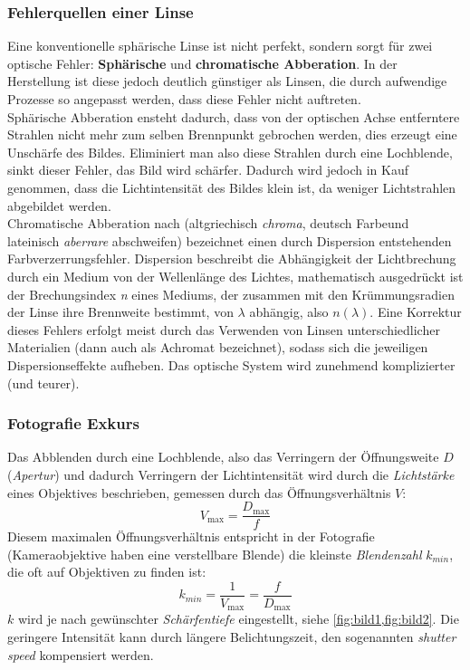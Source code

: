 \subsubsection{Fehlerquellen einer Linse}
Eine konventionelle sphärische Linse ist nicht perfekt, sondern sorgt für zwei optische Fehler: \textbf{Sphärische} und \textbf{chromatische Abberation}. In der Herstellung ist diese jedoch deutlich günstiger als Linsen, die durch aufwendige Prozesse so angepasst werden, dass diese Fehler nicht auftreten.\\
Sphärische Abberation ensteht dadurch, dass von der optischen Achse entferntere Strahlen nicht mehr zum selben Brennpunkt gebrochen werden, dies erzeugt eine Unschärfe des Bildes. Eliminiert man also diese Strahlen durch eine Lochblende, sinkt dieser Fehler, das Bild wird schärfer. Dadurch wird jedoch in Kauf genommen, dass die Lichtintensität des Bildes klein ist, da weniger Lichtstrahlen abgebildet werden.\\
Chromatische Abberation nach (altgriechisch \emph{chroma}, deutsch \glq Farbe\grq und lateinisch \emph{aberrare} \glq abschweifen\grq) bezeichnet einen durch Dispersion entstehenden Farbverzerrungsfehler. Dispersion beschreibt die Abhängigkeit der Lichtbrechung durch ein Medium von der Wellenlänge des Lichtes, mathematisch ausgedrückt ist der Brechungsindex \emph{n} eines Mediums, der zusammen mit den Krümmungsradien der Linse ihre Brennweite bestimmt, von \(\lambda\) abhängig, also \(n(\lambda)\). Eine Korrektur dieses Fehlers erfolgt meist durch das Verwenden von Linsen unterschiedlicher Materialien (dann auch als Achromat bezeichnet), sodass sich die jeweiligen Dispersionseffekte aufheben. Das optische System wird zunehmend komplizierter (und teurer).

\subsubsection{Fotografie Exkurs \autocite{Schärfentiefe}}
Das Abblenden durch eine Lochblende, also das Verringern der Öffnungsweite \(D\) (\emph{Apertur}) und dadurch Verringern der Lichtintensität wird durch die \emph{Lichtstärke} eines Objektives beschrieben, gemessen durch das Öffnungsverhältnis \(V\):
\begin{equation}
    V_{{\text{max}}} = \frac{D_{\text{max}}}{f}
\end{equation}
Diesem maximalen Öffnungsverhältnis entspricht in der Fotografie (Kameraobjektive haben eine verstellbare Blende) die kleinste \emph{Blendenzahl} \(k_{min}\), die oft auf Objektiven zu finden ist:
\begin{equation}
    k_{min}=\frac{1}{V_{\text{max}}}=\frac{f}{D_{\text{max}}}
    \label{eq:k}
\end{equation}
\(k\) wird je nach gewünschter \emph{Schärfentiefe} eingestellt, siehe \cref{fig:bild1,fig:bild2}. Die geringere Intensität kann durch längere Belichtungszeit, den sogenannten \emph{shutter speed} kompensiert werden.

